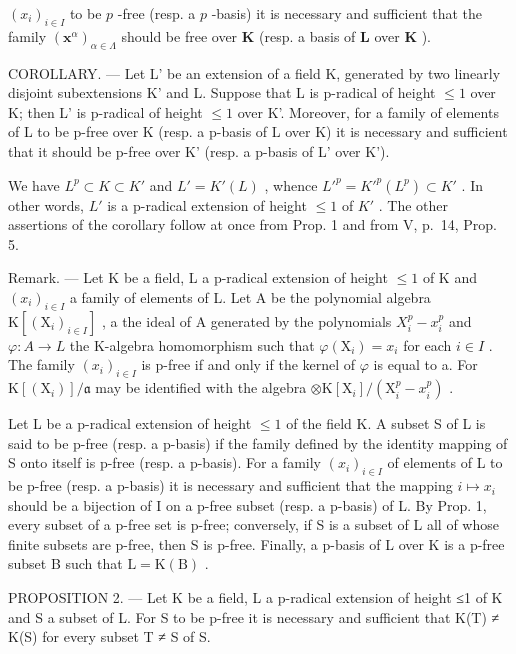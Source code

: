 \((x_{i})_{i\in I}\) to be \(p\) -free (resp. a \(p\) -basis) it is necessary and sufficient that the family \((\mathbf{x}^{\alpha})_{\alpha \in \Lambda}\) should be free over \(\mathbf{K}\) (resp. a basis of \(\mathbf{L}\) over \(\mathbf{K}\) ).

COROLLARY. --- Let L' be an extension of a field K, generated by two linearly disjoint subextensions K' and L. Suppose that L is p-radical of height \(\leqslant 1\) over K; then L' is p-radical of height \(\leqslant 1\) over K'. Moreover, for a family of elements of L to be p-free over K (resp. a p-basis of L over K) it is necessary and sufficient that it should be p-free over K' (resp. a p-basis of L' over K').

We have \(L^{p} \subset K \subset K'\) and \(L' = K'(L)\) , whence \(L'^{p} = K'^{p}(L^{p}) \subset K'\) . In other words, \(L'\) is a p-radical extension of height \(\leqslant 1\) of \(K'\) . The other assertions of the corollary follow at once from Prop. 1 and from V, p.~14, Prop. 5.

Remark. --- Let K be a field, L a p-radical extension of height \(\leqslant1\) of K and \((x_{i})_{i\in I}\) a family of elements of L. Let A be the polynomial algebra \(\mathrm{K}[(\mathrm{X}_{i})_{i\in I}]\) , a the ideal of A generated by the polynomials \(X_{i}^{p}-x_{i}^{p}\) and \(\varphi:A\to L\) the K-algebra homomorphism such that \(\varphi(\mathrm{X}_{i})=x_{i}\) for each \(i\in I\) . The family \((x_{i})_{i\in I}\) is p-free if and only if the kernel of \(\varphi\) is equal to a. For \(\mathrm{K}[(\mathrm{X}_{i})]/\mathfrak{a}\) may be identified with the algebra \(\otimes\mathrm{K}[\mathrm{X}_{i}]/(\mathrm{X}_{i}^{p}-x_{i}^{p})\) .

Let L be a p-radical extension of height \(\leqslant1\) of the field K. A subset S of L is said to be p-free (resp. a p-basis) if the family defined by the identity mapping of S onto itself is p-free (resp. a p-basis). For a family \((x_{i})_{i\in I}\) of elements of L to be p-free (resp. a p-basis) it is necessary and sufficient that the mapping \(i\mapsto x_{i}\) should be a bijection of I on a p-free subset (resp. a p-basis) of L. By Prop. 1, every subset of a p-free set is p-free; conversely, if S is a subset of L all of whose finite subsets are p-free, then S is p-free. Finally, a p-basis of L over K is a p-free subset B such that \(\mathrm{L}=\mathrm{K}(\mathrm{B})\) .

PROPOSITION 2. --- Let K be a field, L a p-radical extension of height ≤1 of K and S a subset of L. For S to be p-free it is necessary and sufficient that K(T) ≠ K(S) for every subset T ≠ S of S.

